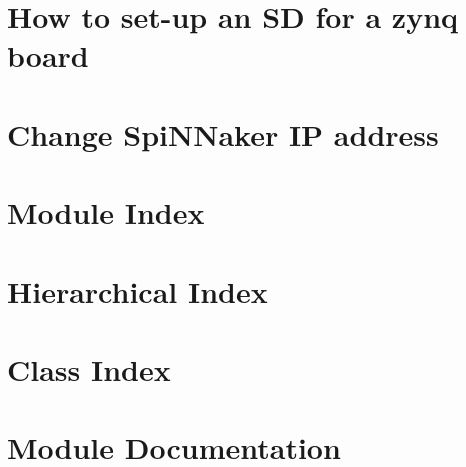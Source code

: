 \documentclass[twoside]{book}
\newcommand{\+}{\discretionary{\mbox{\scriptsize$\hookleftarrow$}}{}{}}
\begin{document}
\chapter{How to set-\/up an SD for a zynq board}
\label{md__mnt_c_Users_AGlover_Documents_projects_event-driven_documentation_howtosetupSD}

\chapter{Change Spi\+N\+Naker IP address}
\label{md__mnt_c_Users_AGlover_Documents_projects_event-driven_documentation_SpiNNakerips}

\chapter{Module Index}

\chapter{Hierarchical Index}

\chapter{Class Index}

\chapter{Module Documentation}

















\end{document}
